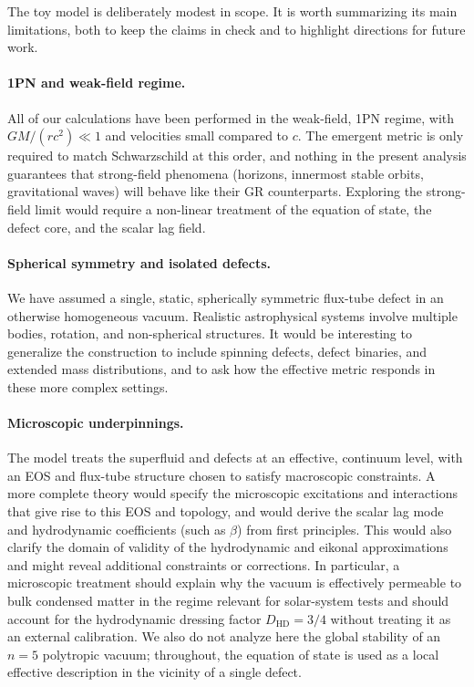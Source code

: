 \documentclass[11pt]{article}
\begin{document}
The toy model is deliberately modest in scope.
It is worth summarizing its main limitations, both to keep the claims in
check and to highlight directions for future work.

\paragraph{1PN and weak-field regime.}
All of our calculations have been performed in the weak-field, 1PN regime,
with $GM/(r c^2) \ll 1$ and velocities small compared to $c$.
The emergent metric is only required to match Schwarzschild at this order,
and nothing in the present analysis guarantees that strong-field phenomena
(horizons, innermost stable orbits, gravitational waves) will behave like
their GR counterparts.
Exploring the strong-field limit would require a non-linear treatment of
the equation of state, the defect core, and the scalar lag field.

\paragraph{Spherical symmetry and isolated defects.}
We have assumed a single, static, spherically symmetric flux-tube defect in
an otherwise homogeneous vacuum.
Realistic astrophysical systems involve multiple bodies, rotation, and
non-spherical structures.
It would be interesting to generalize the construction to include
spinning defects, defect binaries, and extended mass distributions, and to
ask how the effective metric responds in these more complex settings.

\paragraph{Microscopic underpinnings.}
The model treats the superfluid and defects at an effective, continuum
level, with an EOS and flux-tube structure chosen to satisfy macroscopic
constraints.
A more complete theory would specify the microscopic excitations and
interactions that give rise to this EOS and topology, and would derive the
scalar lag mode and hydrodynamic coefficients (such as $\beta$) from
first principles.
This would also clarify the domain of validity of the hydrodynamic and
eikonal approximations and might reveal additional constraints or
corrections.
In particular, a microscopic treatment should explain why the vacuum is
effectively permeable to bulk condensed matter in the regime relevant for
solar-system tests and should account for the hydrodynamic dressing factor
$D_{\mathrm{HD}} = 3/4$ without treating it as an external calibration.
We also do not analyze here the global stability of an $n=5$ polytropic
vacuum; throughout, the equation of state is used as a local effective
description in the vicinity of a single defect.
\end{document}
